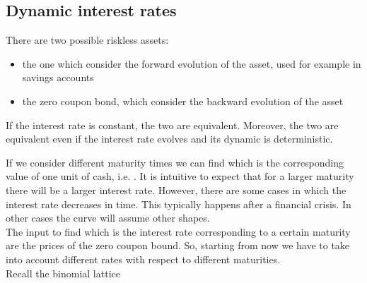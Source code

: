 \subsection{Dynamic interest rates}
\begin{remark}
There are two possible riskless assets:
\begin{itemize}
    \item the one which consider the forward evolution of the asset, used for example in savings accounts
    \item the zero coupon bond, which consider the backward evolution of the asset
\end{itemize}
If the interest rate is constant, the two are equivalent. Moreover, the two are equivalent even if the interest rate evolves and its dynamic is deterministic.
\end{remark}
\noindent If we consider different maturity times we can find which is the corresponding value of one unit of cash, i.e. . It is intuitive to expect that for a larger maturity there will be a larger interest rate. However, there are some cases in which the interest rate decreases in time. This typically happens after a financial crisis. In other cases the curve will assume other shapes.\\
The input to find which is the interest rate corresponding to a certain maturity are the prices of the zero coupon bound. So, starting from now we have to take into account different rates with respect to different maturities. \\
Recall the binomial lattice
\begin{center}
\end{center}
